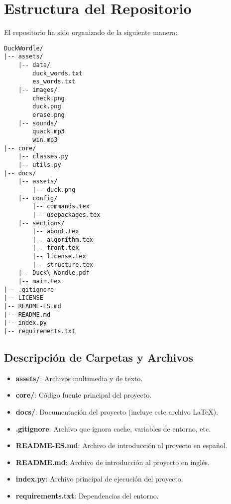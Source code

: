 \section{Estructura del Repositorio}
El repositorio ha sido organizado de la siguiente manera:
\begin{lstlisting}
DuckWordle/
|-- assets/
    |-- data/
        duck_words.txt
        es_words.txt
    |-- images/
        check.png
        duck.png
        erase.png
    |-- sounds/
        quack.mp3
        win.mp3
|-- core/
    |-- classes.py
    |-- utils.py
|-- docs/
    |-- assets/
        |-- duck.png
    |-- config/
        |-- commands.tex
        |-- usepackages.tex
    |-- sections/
        |-- about.tex
        |-- algorithm.tex
        |-- front.tex
        |-- license.tex
        |-- structure.tex
    |-- Duck\_Wordle.pdf
    |-- main.tex
|-- .gitignore
|-- LICENSE
|-- README-ES.md
|-- README.md
|-- index.py
|-- requirements.txt
\end{lstlisting}

\subsection{Descripción de Carpetas y Archivos}

\begin{itemize}
    \item \textbf{assets/}: Archivos multimedia y de texto.
    \item \textbf{core/}: Código fuente principal del proyecto.
    \item \textbf{docs/}: Documentación del proyecto (incluye este archivo \LaTeX).
    \item \textbf{.gitignore}: Archivo que ignora cache, variables de entorno, etc.
    \item \textbf{README-ES.md}: Archivo de introducción al proyecto en español.
    \item \textbf{README.md}: Archivo de introducción al proyecto en inglés.
    \item \textbf{index.py}: Archivo principal de ejecución del proyecto.
    \item \textbf{requirements.txt}: Dependencias del entorno.
\end{itemize}